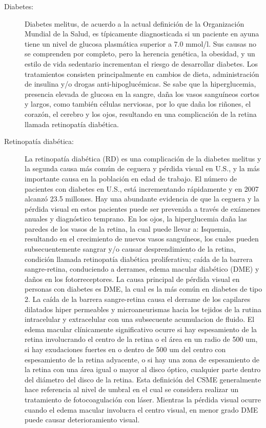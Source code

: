 \begin{description}
    \item[Diabetes:] Diabetes melitus, de acuerdo a la actual definición de la Organización Mundial de la Salud, es típicamente diagnosticada si un paciente en ayuna tiene un nivel de glucosa plasmática superior a 7.0 mmol/l. Sus causas no se comprenden por completo, pero la herencia genética, la obesidad, y un estilo de vida sedentario incrementan el riesgo de desarrollar diabetes. Los tratamientos consisten principalmente en cambios de dieta, administración de insulina y/o drogas anti-hipoglucémicas. Se sabe que la hiperglucemia, presencia elevada de glucosa en la sangre, daña los vasos sanguíneos cortos y largos, como también células nerviosas, por lo que daña los riñones, el corazón, el cerebro y los ojos, resultando en una complicación de la retina llamada retinopatía diabética.
    \item[Retinopatía diabética:] La retinopatía diabética (RD) es una complicación de la diabetes melitus y la segunda causa más común de ceguera y pérdida visual en U.S., y la más importante causa en la población en edad de trabajo. El número de pacientes con diabetes en U.S., está incrementando rápidamente y en 2007 alcanzó 23.5 millones. Hay una abundante evidencia de que la ceguera y la pérdida visual en estos pacientes puede ser prevenida a través de exámenes anuales y  diagnóstico temprano. En los ojos, la hiperglucemia daña las paredes de los vasos de la retina, la cual puede llevar a:
Isquemia, resultando en el crecimiento de nuevos vasos sanguíneos, los cuales pueden subsecuentemente sangrar y/o causar desprendimiento de la retina, condición llamada retinopatía diabética proliferativa;
caída de la barrera sangre-retina, conduciendo a derrames, edema macular diabético (DME) y daños en los fotorreceptores.
La causa principal de pérdida visual en personas con diabetes es DME, la cual es la más común en diabetes de tipo 2. La caída de la barrera sangre-retina causa el derrame de los capilares dilatados hiper permeables y microaneurismas hacia los tejidos de la rutina intracelular y extracelular con una subsecuente acumulacion de fluido. El edema macular clínicamente significativo ocurre si hay espesamiento de la retina involucrando el centro de la retina o el área en un radio de 500 um, si hay exudaciones fuertes en o dentro de 500 um del centro con espesamiento de la retina adyacente, o si hay una zona de espesamiento de la retina con una área igual o mayor al disco óptico, cualquier parte dentro del diámetro del disco de la retina. Esta definición del CSME generalmente hace referencia al nivel de umbral en el cual se considera realizar un tratamiento de fotocoagulación con láser. Mientras la pérdida visual ocurre cuando el edema macular involucra el centro visual, en menor grado DME puede causar deterioramiento visual.

\end{description}

